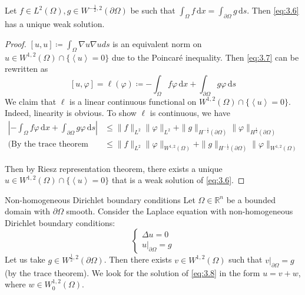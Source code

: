 \documentclass{report}
\begin{document}
\begin{theorem}{}{}
    Let \(f \in L^{2}(\Omega), g \in W^{-\frac{1}{2}, 2}(\partial \Omega)\) be such that \(\int_{\Omega} f \,\mathrm{d}x = \int_{\partial\Omega} g \,\mathrm{d}s\). Then \ref{eq:3.6} has a unique weak solution.  
\end{theorem}

\begin{proof}
    \([u, u] \coloneqq \int_{\Omega} \nabla u \nabla u ds\) is an equivalent norm on \(u \in W^{1, 2}(\Omega) \cap \{\left\langle u \right\rangle = 0\}\) due to the Poincaré inequality. Then \ref{eq:3.7} can be rewritten as
    \[
        [u, \varphi] = \ell(\varphi) \coloneqq  - \int_{\Omega} f\varphi\,\mathrm{d}x + \int_{\partial\Omega} g\varphi\,\mathrm{d}s
    \]
    We claim that \(\ell\) is a linear continuous functional on \(W^{1, 2}(\Omega) \cap \{\left\langle u \right\rangle = 0\}\). Indeed, linearity is obvious. To show \(\ell\) is  continuous, we have
    \begin{align*}
        \left\vert - \int_{\Omega} f\varphi\,\mathrm{d}x + \int_{\partial\Omega} g\varphi\,\mathrm{d}s \right\vert &\leq \|f\|_{L^{2}} \|\varphi\|_{L^{2}} + \|g\|_{H^{-\frac{1}{2}}(\partial \Omega)}\|\varphi\|_{H^{\frac{1}{2}}(\partial \Omega)} \\
        \text{(By the trace theorem and Poincaré's inequality)} &\leq \|f\|_{L^{2}} \|\varphi\|_{W^{1, 2}(\Omega)} + \|g\|_{H^{-\frac{1}{2}}(\partial \Omega)}\|\varphi\|_{W^{1, 2}(\Omega)}  
    \end{align*}

Then by Riesz representation theorem, there exists a unique \(u \in W^{1, 2}(\Omega) \cap \{\left\langle u \right\rangle = 0\}\) that is a weak solution of \ref{eq:3.6}.
\end{proof}

\begin{example}{Non-homogeneous Dirichlet boundary conditions}{}
    Let \(\Omega \in \mathbb{R}^{n}\) be a bounded domain with \(\partial \Omega\) smooth. Consider the Laplace equation with non-homogeneous Dirichlet boundary conditions:
    \begin{equation}\label{eq:3.8}
        \begin{cases}
            \Delta u = 0 \\
            \left. u \right|_{\partial \Omega} = g
        \end{cases}
    \end{equation}
    Let us take \(g \in W^{\frac{1}{2}, 2}(\partial \Omega)\). Then there exists \(v \in W^{1, 2}(\Omega)\) such that \(\left. v \right|_{\partial \Omega} = g\) (by the trace theorem). We look for the solution of \ref{eq:3.8} in the form \(u = v + w\), where \(w \in W^{1, 2}_{0}(\Omega)\).
\end{example}
\end{document}
